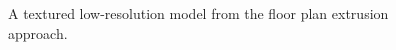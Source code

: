 \documentclass[]{spie}  %
\begin{document}
\begin{figure}
  \caption{A textured low-resolution model from the floor plan extrusion approach.}
  \label{fig:e2d4}
\end{figure}
\end{document}

